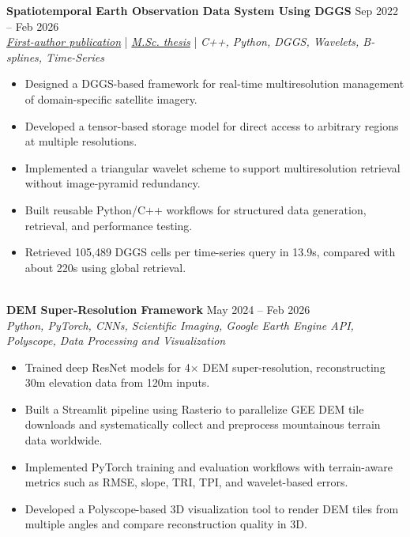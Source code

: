 \documentclass[a4paper,10pt]{article}
\begin{document}
\noindent
\textbf{Spatiotemporal Earth Observation Data System Using DGGS} \hfill Sep 2022 -- Feb 2026 \\
\textit{\href{https://doi.org/10.3390/rs17040570}{First-author publication}} | \textit{\href{https://ucalgary.scholaris.ca/items/114b394b-e516-4732-bd3a-45dd6160d480}{M.Sc. thesis}} | \textit{C++, Python, DGGS, Wavelets, B-splines, Time-Series}
\begin{itemize}[leftmargin=0.25in]
    \item Designed a DGGS-based framework for real-time multiresolution management of domain-specific satellite imagery.
    \item Developed a tensor-based storage model for direct access to arbitrary regions at multiple resolutions.
    \item Implemented a triangular wavelet scheme to support multiresolution retrieval without image-pyramid redundancy.
    \item Built reusable Python/C++ workflows for structured data generation, retrieval, and performance testing.
    \item Retrieved 105,489 DGGS cells per time-series query in 13.9s, compared with about 220s using global retrieval.
\end{itemize}

\noindent \\
\textbf{DEM Super-Resolution Framework} \hfill May 2024 -- Feb 2026 \\
\textit{Python, PyTorch, CNNs, Scientific Imaging, Google Earth Engine API, Polyscope, Data Processing and Visualization}
\begin{itemize}[leftmargin=0.25in]
    \item Trained deep ResNet models for 4$\times$ DEM super-resolution, reconstructing 30m elevation data from 120m inputs.
    \item Built a Streamlit pipeline using Rasterio to parallelize GEE DEM tile downloads and systematically collect and preprocess mountainous terrain data worldwide.
    \item Implemented PyTorch training and evaluation workflows with terrain-aware metrics such as RMSE, slope, TRI, TPI, and wavelet-based errors.
    \item Developed a Polyscope-based 3D visualization tool to render DEM tiles from multiple angles and compare reconstruction quality in 3D.
\end{itemize}
\end{document}
